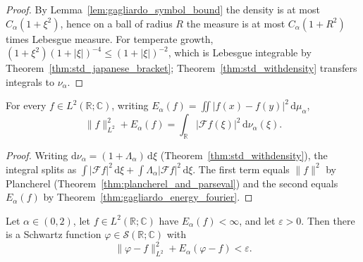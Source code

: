 \begin{proof}
\leanok
By Lemma~\ref{lem:gagliardo_symbol_bound} the density is at most $C_\alpha (1 + \xi^2)$, hence on a ball of radius $R$ the measure is at most $C_\alpha (1 + R^2)$ times Lebesgue measure. For temperate growth, $(1 + \xi^2)(1 + \lvert \xi \rvert)^{-4} \le (1 + \lvert \xi \rvert)^{-2}$, which is Lebesgue integrable by Theorem~\ref{thm:std_japanese_bracket}; Theorem~\ref{thm:std_withdensity} transfers integrals to $\nu_\alpha$.
\end{proof}

\begin{theorem}\label{thm:norm_energy_fourier}
\leanok
For every $f \in L^2(\mathbb{R}; \mathbb{C})$, writing $E_\alpha(f) = \iint \lvert f(x) - f(y) \rvert^2 \, \mathrm{d}\mu_\alpha$,
\[
  \lVert f \rVert_{L^2}^2 + E_\alpha(f) = \int_{\mathbb{R}} \lvert \mathcal{F} f(\xi) \rvert^2 \, \mathrm{d}\nu_\alpha(\xi).
\]
\end{theorem}

\begin{proof}
\leanok
Writing $\mathrm{d}\nu_\alpha = (1 + \Lambda_\alpha)\, \mathrm{d}\xi$ (Theorem~\ref{thm:std_withdensity}), the integral splits as $\int \lvert \mathcal{F}f \rvert^2 \, \mathrm{d}\xi + \int \Lambda_\alpha \lvert \mathcal{F}f \rvert^2 \, \mathrm{d}\xi$. The first term equals $\lVert f \rVert^2$ by Plancherel (Theorem~\ref{thm:plancherel_and_parseval}) and the second equals $E_\alpha(f)$ by Theorem~\ref{thm:gagliardo_energy_fourier}.
\end{proof}

\begin{theorem}\label{thm:schwartz_density_complex}
\leanok
Let $\alpha \in (0, 2)$, let $f \in L^2(\mathbb{R}; \mathbb{C})$ have $E_\alpha(f) < \infty$, and let $\varepsilon > 0$. Then there is a Schwartz function $\varphi \in \mathcal{S}(\mathbb{R}; \mathbb{C})$ with
\[
  \lVert \varphi - f \rVert_{L^2}^2 + E_\alpha(\varphi - f) < \varepsilon.
\]
\end{theorem}


